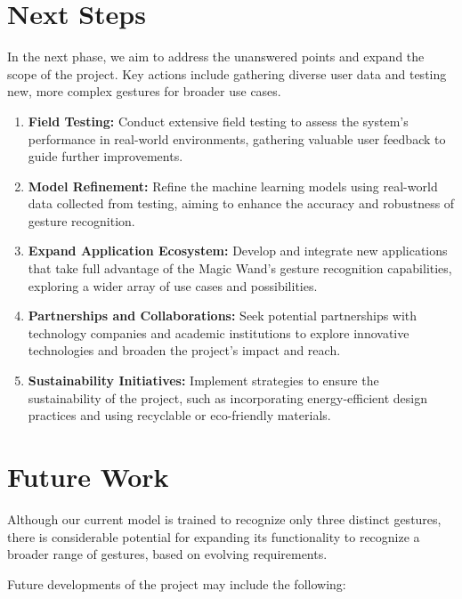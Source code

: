 \section{Next Steps}

In the next phase, we aim to address the unanswered points and expand the scope of the project. Key actions include gathering diverse user data and testing new, more complex gestures for broader use cases.

\begin{enumerate}
	\item \textbf{Field Testing:} 
	Conduct extensive field testing to assess the system’s performance in real-world environments, gathering valuable user feedback to guide further improvements.
	
	\item \textbf{Model Refinement:} 
	Refine the machine learning models using real-world data collected from testing, aiming to enhance the accuracy and robustness of gesture recognition.
	
	\item \textbf{Expand Application Ecosystem:} 
	Develop and integrate new applications that take full advantage of the Magic Wand’s gesture recognition capabilities, exploring a wider array of use cases and possibilities.
	
	\item \textbf{Partnerships and Collaborations:} 
	Seek potential partnerships with technology companies and academic institutions to explore innovative technologies and broaden the project’s impact and reach.
	
	\item \textbf{Sustainability Initiatives:} 
	Implement strategies to ensure the sustainability of the project, such as incorporating energy-efficient design practices and using recyclable or eco-friendly materials.
\end{enumerate}

\section{Future Work}

Although our current model is trained to recognize only three distinct gestures, there is considerable potential for expanding its functionality to recognize a broader range of gestures, based on evolving requirements.

Future developments of the project may include the following:

